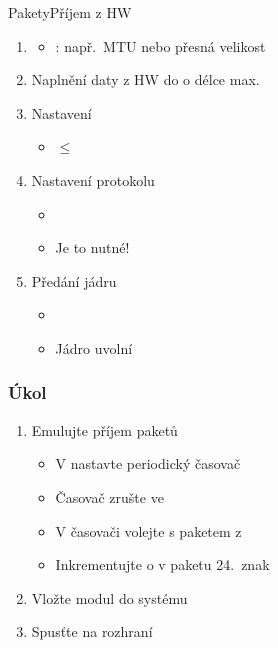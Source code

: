 \begin{frame}{Pakety}{Příjem z HW}

  \begin{enumerate}
    \item {}
    \begin{itemize}
      \item {}: např.\ MTU nebo přesná velikost
    \end{itemize}

    \pause

    \item Naplnění daty z HW do  o délce max.\ 
    \item Nastavení 
    \begin{itemize}
      \item {} $\leq$ 
    \end{itemize}

    \pause

    \item Nastavení protokolu
    \begin{itemize}
      \item {}
      \item Je to nutné!
    \end{itemize}

    \pause

    \item Předání  jádru
    \begin{itemize}
      \item {}
      \item Jádro  uvolní
    \end{itemize}

  \end{enumerate}

\end{frame}

\begin{frame}
  \frametitle{Úkol}

  \begin{enumerate}
    \item Emulujte příjem paketů
    \begin{itemize}
      \item V  nastavte periodický časovač
      \item Časovač zrušte ve 
      \item V časovači volejte  s paketem z 
      \item Inkrementujte o  v paketu 24.\ znak
    \end{itemize}

    \item Vložte modul do systému
    \item Spusťte  na  rozhraní
  \end{enumerate}

\end{frame}

